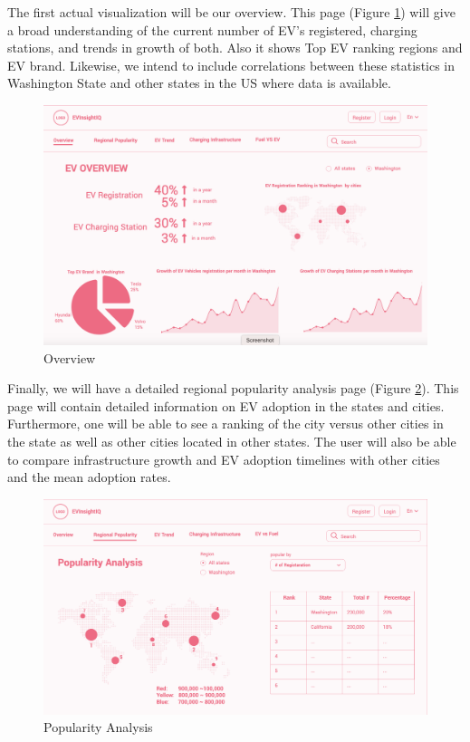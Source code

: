 \documentclass{article}
\begin{document}
The first actual visualization will be our overview.  This page (Figure \ref{fig:overview}) will give a broad understanding of the current number of EV's registered, charging stations,
and trends in growth of both. Also it shows Top EV ranking regions and EV brand. Likewise, we intend to include correlations
between these statistics in Washington State and other states in the US where
data is available.
\begin{figure}[h]
    \centering
    \includegraphics[scale=0.25]{Overview}
    \caption{Overview}
    \label{fig:overview}
\end{figure}

Finally, we will have a detailed regional popularity analysis page (Figure \ref{fig:city}).
This page will contain detailed information on EV adoption in the states and cities.  Furthermore, one will be able to see a ranking of the
city versus other cities in the state as well as other cities located in other
states.  The user will also be able to compare infrastructure growth and EV
adoption timelines with other cities and the mean adoption rates.
\begin{figure}[h]
    \centering
    \includegraphics[scale=0.25]{Popularity Analysis}
    \caption{Popularity Analysis}
    \label{fig:city}
\end{figure}
\end{document}

